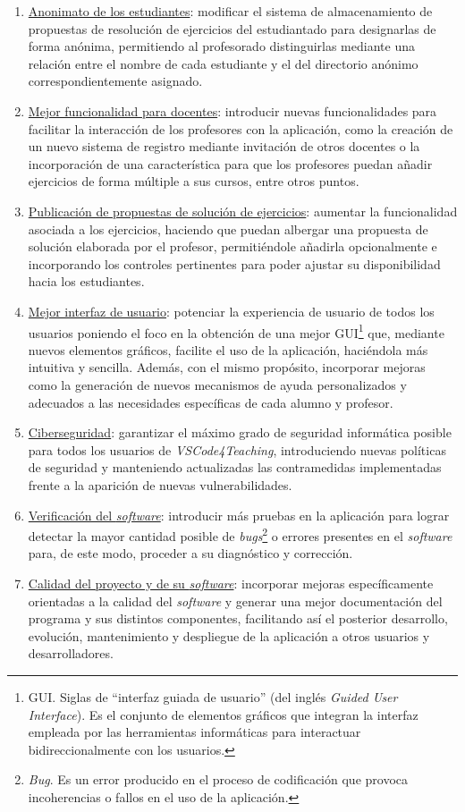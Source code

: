 \begin{enumerate}
    \item \underline{Anonimato de los estudiantes}: modificar el sistema de almacenamiento de propuestas de resolución de ejercicios del estudiantado para designarlas de forma anónima, permitiendo al profesorado distinguirlas mediante una relación entre el nombre de cada estudiante y el del directorio anónimo correspondientemente asignado.
    \item \underline{Mejor funcionalidad para docentes}: introducir nuevas funcionalidades para facilitar la interacción de los profesores con la aplicación, como la creación de un nuevo sistema de registro mediante invitación de otros docentes o la incorporación de una característica para que los profesores puedan añadir ejercicios de forma múltiple a sus cursos, entre otros puntos.
    \item \underline{Publicación de propuestas de solución de ejercicios}: aumentar la funcionalidad asociada a los ejercicios, haciendo que puedan albergar una propuesta de solución elaborada por el profesor, permitiéndole añadirla opcionalmente e incorporando los controles pertinentes para poder ajustar su disponibilidad hacia los estudiantes.
    \item \underline{Mejor interfaz de usuario}: potenciar la experiencia de usuario de todos los usuarios poniendo el foco en la obtención de una mejor GUI\footnote{GUI. Siglas de ``interfaz guiada de usuario'' (del inglés \textit{Guided User Interface}). Es el conjunto de elementos gráficos que integran la interfaz empleada por las herramientas informáticas para interactuar bidireccionalmente con los usuarios.} que, mediante nuevos elementos gráficos, facilite el uso de la aplicación, haciéndola más intuitiva y sencilla. Además, con el mismo propósito, incorporar mejoras como la generación de nuevos mecanismos de ayuda personalizados y adecuados a las necesidades específicas de cada alumno y profesor.
    \item \underline{Ciberseguridad}: garantizar el máximo grado de seguridad informática posible para todos los usuarios de \textit{VSCode4Teaching}, introduciendo nuevas políticas de seguridad y manteniendo actualizadas las contramedidas implementadas frente a la aparición de nuevas vulnerabilidades.
    \item \underline{Verificación del \textit{software}}: introducir más pruebas en la aplicación para lograr detectar la mayor cantidad posible de \textit{bugs}\footnote{\textit{Bug}. Es un error producido en el proceso de codificación que provoca incoherencias o fallos en el uso de la aplicación.} o errores presentes en el \textit{software} para, de este modo, proceder a su diagnóstico y corrección.
    \item \underline{Calidad del proyecto y de su \textit{software}}: incorporar mejoras específicamente orientadas a la calidad del \textit{software} y generar una mejor documentación del programa y sus distintos componentes, facilitando así el posterior desarrollo, evolución, mantenimiento y despliegue de la aplicación a otros usuarios y desarrolladores.
\end{enumerate}

